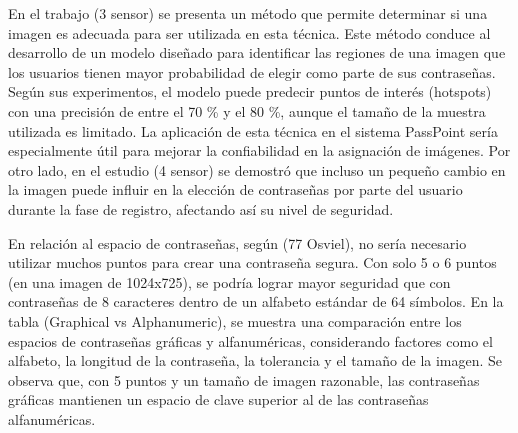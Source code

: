 \documentclass[12pt]{report}
\begin{document}
	
	En el trabajo (3 sensor) se presenta un método que permite determinar si una imagen es adecuada para ser utilizada en esta técnica. Este método conduce al desarrollo de un modelo diseñado para identificar las regiones de una imagen que los usuarios tienen mayor probabilidad de elegir como parte de sus contraseñas. Según sus experimentos, el modelo puede predecir puntos de interés (hotspots) con una precisión de entre el 70 \% y el 80 \%, aunque el tamaño de la muestra utilizada es limitado. La aplicación de esta técnica en el sistema PassPoint sería especialmente útil para mejorar la confiabilidad en la asignación de imágenes. Por otro lado, en el estudio (4 sensor) se demostró que incluso un pequeño cambio en la imagen puede influir en la elección de contraseñas por parte del usuario durante la fase de registro, afectando así su nivel de seguridad.    

	
	En relación al espacio de contraseñas, según (77 Osviel), no sería necesario utilizar muchos puntos para crear una contraseña segura. Con solo 5 o 6 puntos (en una imagen de 1024x725), se podría lograr mayor seguridad que con contraseñas de 8 caracteres dentro de un alfabeto estándar de 64 símbolos. En la tabla (Graphical vs Alphanumeric), se muestra una comparación entre los espacios de contraseñas gráficas y alfanuméricas, considerando factores como el alfabeto, la longitud de la contraseña, la tolerancia y el tamaño de la imagen. Se observa que, con 5 puntos y un tamaño de imagen razonable, las contraseñas gráficas mantienen un espacio de clave superior al de las contraseñas alfanuméricas.
	
\end{document}
